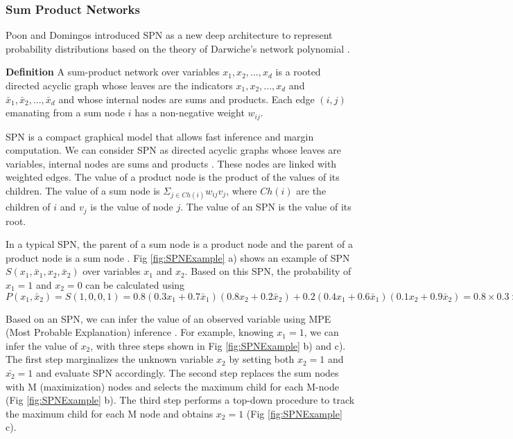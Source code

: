 \documentclass[journal]{IEEEtran}
\begin{document}
\subsubsection{Sum Product Networks}

Poon and Domingos \cite{poon2011SPNIntroduce} introduced SPN as a new deep architecture to represent probability distributions  based on the theory of Darwiche's network polynomial \cite{Darwiche:2003:DAI:765568.765570}.

\textbf{Definition} \cite{poon2011SPNIntroduce} A sum-product network over variables $ x_1,x_2,...,x_d $ is a rooted directed acyclic graph whose leaves are the indicators $ x_1,x_2,...,x_d $ and $ \bar{x}_1,\bar{x}_2,...,\bar{x}_d $ and whose internal nodes are sums and products. Each edge $ (i,j) $ emanating from a sum node $ i $ has a non-negative weight $ w_{ij} $.




SPN is a compact graphical model that allows fast inference and margin computation. We can consider SPN as directed acyclic graphs whose leaves are variables, internal nodes are sums and products \cite{poon2011SPNIntroduce}. These nodes are linked with weighted edges.
The value of a product node is the product of the values of its children. The value of a sum node is $ \Sigma_{j\in Ch(i)}w_{ij}v_j $, where $ Ch(i) $ are the children of $ i $ and $ v_j $ is the value of node $ j $. The value of an SPN is the value of its root.





In a typical SPN, the parent of a sum node is a product node and the parent of a product node is a sum node \cite{SPNWangXiaogangFacial,poon2011SPNIntroduce}. Fig \ref{fig:SPNExample} a) shows an example of SPN $ S(x_1,\bar{x}_1,x_2,\bar{x}_2) $ over variables $ x_1 $ and $ x_2 $. Based on this SPN, the probability of $ x_1=1 $ and $ x_2=0 $ can be calculated using $ P(x_1,\bar{x}_2)=S(1,0,0,1)=0.8(0.3x_1+0.7\bar{x}_1)(0.8x_2+0.2\bar{x}_2)+0.2(0.4x_1+0.6\bar{x}_1)(0.1x_2+0.9\bar{x}_2)=0.8\times0.3\times0.2+0.2\times0.4\times0.9=0.12 $

Based on an SPN, we can infer the value of an observed variable using MPE (Most Probable Explanation) inference \cite{Darwiche:2003:DAI:765568.765570}. For example, knowing $ x_1=1 $, we can infer the value of $ x_2 $, with three steps shown in Fig \ref{fig:SPNExample} b) and c). The first step marginalizes the unknown variable $ x_2 $ by setting both $ x_2=1 $ and $ \bar{x_2}=1 $ and evaluate SPN accordingly. The second step replaces the sum nodes with M (maximization) nodes and selects the maximum child for each M-node (Fig \ref{fig:SPNExample} b). The third step performs a top-down procedure to track the maximum child for each M node and obtains $ x_2=1 $ (Fig \ref{fig:SPNExample} c).
\end{document}
